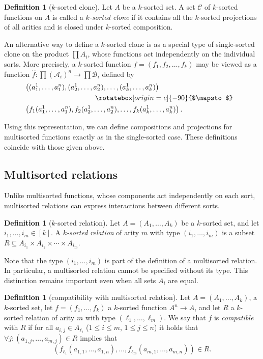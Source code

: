 \documentclass{amsart}
\numberwithin{equation}{section}
\theoremstyle{plain}
\theoremstyle{definition}
\newtheorem{definition}[theorem]{Definition}
\def\set#1{#1}
\def\relation#1{#1}
\def\clone#1{\mathcal{#1}}
\begin{document}
\begin{definition}[$k$-sorted clone]
Let $\set{A}$ be a $k$-sorted set. A set $\clone{C}$ of $k$-sorted functions on $\set{A}$ is called a {\it $k$-sorted clone} if it contains all the $k$-sorted projections of all arities and is closed under $k$-sorted composition.
\end{definition}

An alternative way to define a $k$-sorted clone is as a special type of single-sorted clone on the product $\prod \set{A}_i$, whose functions act independently on the individual sorts. More precisely, a $k$-sorted function $f=(f_1,f_2,\dots,f_k)$ may be viewed as a function $\hat{f}:\prod ({\mathcal A}_i)^n \to \prod {\mathcal B}_i$ defined by
\newcommand{\vmapsto}{\rotatebox[origin=c]{-90}{$\mapsto$}}
\begin{align*}
  &\left( (a^1_1, \dots, a^n_1), (a^1_2,\dots, a_2^n), \dots, (a_k^1, \dots, a_k^n)\right)\cr
  &\hskip3.5cm\vmapsto \cr
  &\left( f_1(a^1_1, \dots, a^n_1), f_2(a^1_2,\dots, a_2^n), \dots, f_k(a_k^1, \dots, a_k^n)\right) .
\end{align*}
 
Using this representation, we can define compositions and projections for multisorted functions exactly as in the single-sorted case. These definitions coincide with those given above.

\subsection{Multisorted relations}

Unlike multisorted functions, whose components act independently on each sort, multisorted relations can express interactions between different sorts.

\begin{definition}[$k$-sorted relation]
Let $\set{A}=(\set{A}_1,\dots,\set{A}_k)$ be a $k$-sorted set, and let $i_1,\dots, i_m \in [k]$. A {\em $k$-sorted relation} of arity $m$ with type $(i_1,\dots, i_m )$ is a subset $\relation{R}\subseteq \set{A}_{i_1}\times \set{A}_{i_2}\times\cdots\times \set{A}_{i_m}$.
\end{definition}

Note that the type $(i_1,\dots,i_m)$ is part of the definition of a multisorted relation. In particular, a multisorted relation cannot be specified without its type. This distinction remains important even when all sets $\set{A}_i$ are equal.

\begin{definition}[compatibility with multisorted relation]
Let $\set{A}=(\set{A}_1,\dots,\set{A}_k)$, a $k$-sorted set, let $f=(f_1,\dots,f_k)$ a $k$-sorted function $\set{A}^n\to \set{A}$, and let $\relation{R}$ a $k$-sorted relation of arity $m$ with type $(\ell_1,\dots, \ell_m)$. We say that $f$ is {\em compatible} with $\relation{R}$ if for all $a_{i,j} \in \set{A}_{\ell_i}$ ($1\leq i\leq m$, $1\leq j\leq n$) it holds that $\forall j\colon (a_{1,j},\dots,a_{m,j})\in \relation{R}$ implies that
$$(f_{\ell_1} (a_{1,1},\dots,a_{1,n}),\dots,f_{\ell_m}(a_{m,1},\dots,a_{m,n}))\in \relation{R}.$$
\end{definition}
\end{document}
